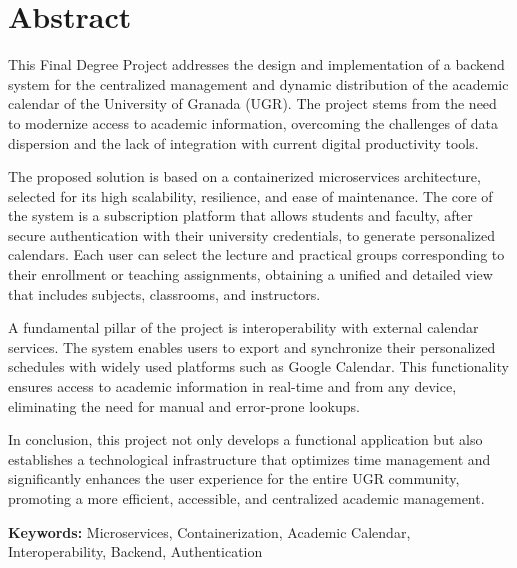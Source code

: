 \chapter*{Abstract}
This Final Degree Project addresses the design and implementation of a backend system for the centralized management and dynamic distribution of the academic calendar of the University of Granada (UGR). The project stems from the need to modernize access to academic information, overcoming the challenges of data dispersion and the lack of integration with current digital productivity tools.

The proposed solution is based on a containerized microservices architecture, selected for its high scalability, resilience, and ease of maintenance. The core of the system is a subscription platform that allows students and faculty, after secure authentication with their university credentials, to generate personalized calendars. Each user can select the lecture and practical groups corresponding to their enrollment or teaching assignments, obtaining a unified and detailed view that includes subjects, classrooms, and instructors.

A fundamental pillar of the project is interoperability with external calendar services. The system enables users to export and synchronize their personalized schedules with widely used platforms such as Google Calendar. This functionality ensures access to academic information in real-time and from any device, eliminating the need for manual and error-prone lookups.

In conclusion, this project not only develops a functional application but also establishes a technological infrastructure that optimizes time management and significantly enhances the user experience for the entire UGR community, promoting a more efficient, accessible, and centralized academic management.

\vspace{.5cm}

\textbf{Keywords:} Microservices, Containerization, Academic Calendar, Interoperability, Backend, Authentication